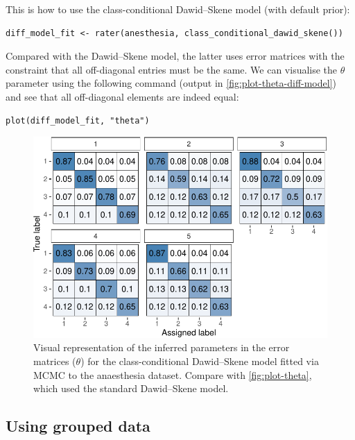 This is how to use the class-conditional Dawid--Skene model (with default prior):

\begin{verbatim}
diff_model_fit <- rater(anesthesia, class_conditional_dawid_skene())
\end{verbatim}

Compared with the Dawid--Skene model, the latter uses error matrices with the
constraint that all off-diagonal entries must be the same. We can visualise
the \(\theta\) parameter using the following command (output in
\autoref{fig:plot-theta-diff-model}) and see that all off-diagonal elements are
indeed equal:

\begin{verbatim}
plot(diff_model_fit, "theta")
\end{verbatim}

\begin{figure}

{\centering \includegraphics{rater_files/figure-latex/plot-theta-diff-model-1} 

}

\caption{Visual representation of the inferred parameters in the error matrices ($\theta$) for the class-conditional Dawid--Skene model fitted via MCMC to the anaesthesia dataset.  Compare with \autoref{fig:plot-theta}, which used the standard Dawid--Skene model.}\label{fig:plot-theta-diff-model}
\end{figure}

\hypertarget{sec:using-grouped-data}{%
\subsection{Using grouped data}\label{sec:using-grouped-data}}

